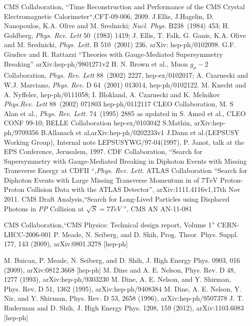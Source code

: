 \begin{thebibliography}{9}
CMS Collaboration, ``Time Reconstruction and Performance of the CMS Crystal Electromagnetic Calorimeter``,CFT-09-006, 2009.
J.Ellis, J.Hagelin, D. Nanopoulos, K.A. Olive and M. Srednicki; \emph{Nucl. Phys.} B238~(1984) 453; H. Goldberg, \emph{Phys. Rev. Lett} 50~(1983) 1419;
J. Ellis, T. Falk, G. Ganis, K.A. Olive and M. Srednicki, \emph{Phys. Lett.} B 510~(2001) 236, arXiv: hep-ph/0102098.
G.F. Giudice and R. Rattazzi ``Theories with Gauge-Mediated Supersymmetry Breaking'' arXiv:hep-ph/9801271v2
H. N. Brown et al., Muon $g_{\mu}-2$ Collaboration, \emph{Phys. Rev. Lett} 88~(2002) 2227, hep-ex/0102017; A. Czarnecki and W.J. Marciano,
\emph{ Phys. Rev.} D 64~(2001) 013014, hep-ph/0102122.
M. Knecht and A. Nyffeler, hep-ph/0111058; I. Blokland, A. Czarnecki and K. Melnikov \emph{Phys.Rev. Lett} 88~(2002) 071803 hep-ph/0112117
CLEO Collaboration, M. S Alan et al., \emph{Phys. Rev. Lett.} 74~(1995) 2885 as updated in S. Amed et al., CLEO CONF 99-10;
BELLE Collaboration hep-ex/0103042
S.Mathin, arXiv:hep-ph/9709356
B.Allanach et al,arXiv:hep-ph/0202233v1
J.Dann et al.(LEPSUSY Working Group), Internal note LEPSUSYWG/97-04(1997), P. Janot, talk at the EPS Conference, Jerusalem, 1997.
CDF Collaboration, ``Search for Supersymmetry with Gauge-Mediated Breaking in Diphoton Events with Missing Transverse Energy at CDFII ``,\emph{Phys. Rev. Lett.}
 ATLAS Collaboration ``Search for Diphoton Events with Large Missing Transverse Momentum in  of $\text{7TeV}$ Proton-Proton Collision Data with the ATLAS Detector'', arXiv:1111.4116v1,17th Nov 2011. 
CMS Draft Analysis,``Search for Long-Lived Particles using Displaced Photons in \emph{PP} Collision at $\sqrt{S}=7TeV$ '', CMS AN AN-11-081 

CMS Collaboration,``CMS Physics: Technical design report, Volume 1'' CERN-LHCC-2006-001
P. Meade, N. Seiberg, and D. Shih, Prog. Theor. Phys.
Suppl. 177, 143 (2009), arXiv:0801.3278 [hep-ph]

M. Buican, P. Meade, N. Seiberg, and D. Shih, J. High Energy Phys. 0903, 016 (2009), arXiv:0812.3668 [hep-ph]
M. Dine and A. E. Nelson, Phys. Rev. D 48, 1277
(1993), arXiv:hep-ph/9303230
M. Dine, A. E. Nelson, and Y. Shirman, Phys. Rev. D
51, 1362 (1995), arXiv:hep-ph/9408384
M. Dine, A. E. Nelson, Y. Nir, and Y. Shirman, Phys.
Rev. D 53, 2658 (1996), arXiv:hep-ph/9507378
 J. T. Ruderman and D. Shih, J. High Energy Phys.
1208, 159 (2012), arXiv:1103.6083 [hep-ph]


\end{thebibliography}
